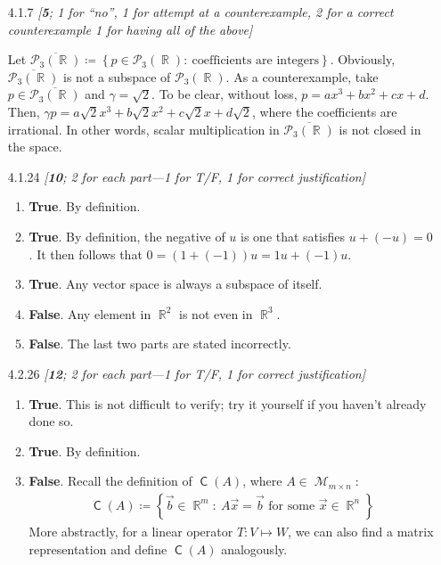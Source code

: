 \documentclass{amsart}
\theoremstyle{definition}
\theoremstyle{definition}
\DeclareMathOperator{\R}{\mathbb{R}}
\DeclareMathOperator{\1}{\mathbbm{1}}
\DeclareMathOperator{\MM}{\mathcal{M}}
\DeclareMathOperator{\col}{\mathsf{C}}
\newcommand{\condset}[4]{\left\{ #1  : \: #2 #3 #4 \right\}}
\newcommand{\polyn}[2]{\mathcal{P}_{#1}(#2)}
\begin{document}
\begin{enumerate}[itemsep = 2mm]
		\item[4.1.7] \textit{[\textbf{5}; 1 for ``no'', 1 for attempt at a counterexample, 2 for a correct counterexample 1 for having all of the above]}
		
		Let $\overline{\polyn{3}{\R}} \coloneqq \condset{ p \in \polyn{3}{\R}}{ \text{coefficients are integers} }{}{}$. Obviously, $\overline{\polyn{3}{\R}}$ is not a subspace of $\polyn{3}{\R}$. As a counterexample, take $p \in \overline{\polyn{3}{\R}}$ and $\gamma = \sqrt{2}$. To be clear, without loss, $p = ax^3 + bx^2 + cx + d$. Then, $\gamma p = a\sqrt{2} x^3 + b\sqrt{2} x^2 + c\sqrt{2} x + d\sqrt{2}$, where the coefficients are irrational. In other words, scalar multiplication in $\overline{\polyn{3}{\R}}$ is not closed in the space.
		
		
		\item[4.1.24] \textit{[\textbf{10}; 2 for each part---1 for T/F, 1 for correct justification]}
		
		\begin{enumerate}
			\item \textbf{True}. By definition.
			
			
			\item \textbf{True}. By definition, the negative of $u$ is one that satisfies $u + (-u) = 0$. It then follows that $0 = (1 + (-1)) u = 1u + (-1)u $.
			
			
			\item \textbf{True}. Any vector space is always a subspace of itself. 
			
			
			\item \textbf{False}. Any element in $\R^2$ is not even in $\R^3$.
			
			
			\item \textbf{False}. The last two parts are stated incorrectly.
		\end{enumerate}
		
		
		
		\item[4.2.26] \textit{[\textbf{12}; 2 for each part---1 for T/F, 1 for correct justification]}
		
		\begin{enumerate}
			\item \textbf{True}. This is not difficult to verify; try it yourself if you haven't already done so. 
			
			\item \textbf{True}. By definition.
			
			\item \textbf{False}. Recall the definition of $\col(A)$, where $A \in \MM_{m \times n}$:
			\begin{align*}
				\col(A) \coloneqq \condset{\vec{b} \in \R^m}{A\vec{x}}{=}{\vec{b} \text{ for some } \vec{x} \in \R^n}
			\end{align*}
			More abstractly, for a linear operator $T: V \mapsto W$, we can also find a matrix representation and define $\col(A)$ analogously.
			

\end{enumerate}
\end{enumerate}
\end{document}
